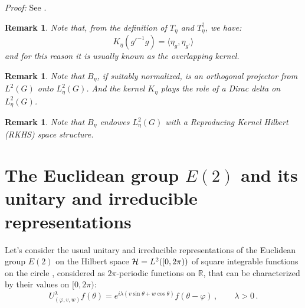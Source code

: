 \documentclass[11pt]{article}
\newtheorem{remark}[definition]{Remark}
\begin{document}
\noindent\textit{Proof:} See \cite{AAG14}.


\begin{remark}\label{Remark1-OverlappingKernel}
Note that, from the definition of $T_\eta$ and $T_\eta^\dagger$, we have:
%
\begin{equation}
 K_\eta(g'^{-1}g) = \langle \eta_g,\eta_{g'}\rangle
\end{equation}
and for this reason it is usually known as the overlapping kernel.

\end{remark}

\begin{remark}\label{Remark2-OverlappingKernel}
Note that $B_\eta$, if suitably normalized, is an orthogonal projector from $L^2(G)$ onto $L_\eta^2(G)$. And the kernel  $K_\eta$ plays the role of a Dirac delta on $L_\eta^2(G)$. 


\end{remark}

\begin{remark}\label{Remark3-OverlappingKernel}
Note that $B_\eta$ endowes  $L_\eta^2(G)$ with a Reproducing Kernel Hilbert (RKHS) space structure. 

\end{remark}

\section{The Euclidean group $E(2)$ and its unitary and irreducible representations}



Let's consider the usual unitary and irreducible representations of the Euclidean group $E(2)$ on the Hilbert space ${\cal H}=L^2([0,2\pi))$ of square integrable functions on the circle \cite{Isham91}, considered as $2\pi$-periodic functions on $\mathbb{R}$, that can be characterized by their values on $[0,2\pi)$:
%
\begin{equation}
 U_{(\varphi,v,w)}^\lambda f(\theta)=e^{i \lambda(v\sin\theta + w\cos\theta)}f(\theta-\varphi)\,,\qquad \lambda>0\,.
 \end{equation}
 
\end{document}
